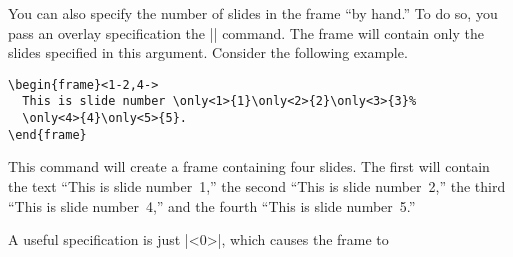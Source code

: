 You can also specify the number of slides in the frame ``by hand.'' To
do so, you pass an overlay specification the |\frame| command. The
frame will contain only the slides specified in this
argument. Consider the following example. 

\begin{verbatim}
\begin{frame}<1-2,4->
  This is slide number \only<1>{1}\only<2>{2}\only<3>{3}%
  \only<4>{4}\only<5>{5}.
\end{frame}
\end{verbatim}
This command will create a frame containing four slides. The first
will contain the text ``This is slide number~1,'' the second ``This is
slide number~2,'' the third ``This is slide number~4,'' and the fourth
``This is slide number~5.''

A useful specification is just |<0>|, which causes the frame to
